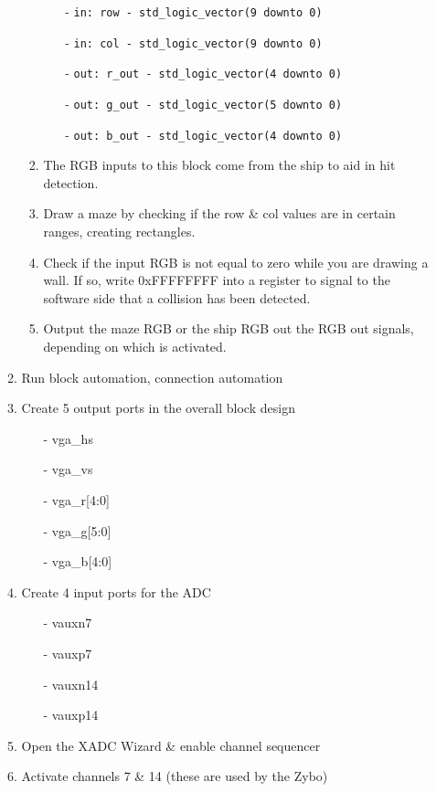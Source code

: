 \documentclass[12pt]{article}
\begin{document}
\begin{itemize}
\begin{enumerate}
\begin{enumerate}
\begin{itemize}[noitemsep, nolistsep]
							\item[-] \texttt{in: row - std\_logic\_vector(9 downto 0)}
							\item[-] \texttt{in: col - std\_logic\_vector(9 downto 0)}
							\item[-] \texttt{out: r\_out - std\_logic\_vector(4 downto 0)}
							\item[-] \texttt{out: g\_out - std\_logic\_vector(5 downto 0)}
							\item[-] \texttt{out: b\_out - std\_logic\_vector(4 downto 0)}
						\end{itemize}
					\item The RGB inputs to this block come from the ship to aid in hit detection.
					\item Draw a maze by checking if the row \& col values are in certain ranges, creating rectangles.
					\item Check if the input RGB is not equal to zero while you are drawing a wall. If so, write 0xFFFFFFFF into a register to signal to the software side that a collision has been detected.
					\item Output the maze RGB or the ship RGB out the RGB out signals, depending on which is activated.
				\end{enumerate}
			\item Run block automation, connection automation
			\item Create 5 output ports in the overall block design
				\begin{itemize}[noitemsep, nolistsep]
					\item[-] vga\_hs
					\item[-] vga\_vs
					\item[-] vga\_r[4:0]
					\item[-] vga\_g[5:0]
					\item[-] vga\_b[4:0]
				\end{itemize}
			\item Create 4 input ports for the ADC
				\begin{itemize}[noitemsep,nolistsep]
					\item[-] vauxn7
					\item[-] vauxp7
					\item[-] vauxn14
					\item[-] vauxp14
				\end{itemize}
			\item Open the XADC Wizard \& enable channel sequencer
			\item Activate channels 7 \& 14 (these are used by the Zybo)

\end{enumerate}
\end{itemize}
\end{document}

